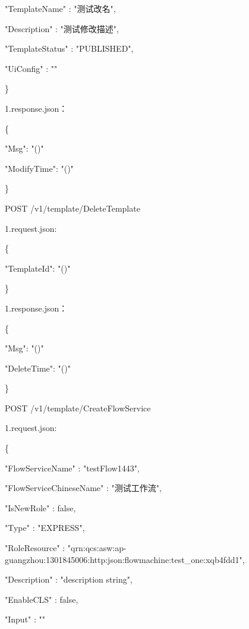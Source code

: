 "TemplateName"        : "测试改名",

"Description"         : "测试修改描述",


"TemplateStatus"      : "PUBLISHED",

"UiConfig"            : ""

\}

1.response.json：

\{

    "Msg": "\@exists()"

    "ModifyTime": "\@exists()"

\}

POST /v1/template/DeleteTemplate

1.request.json:

\{

    "TemplateId": "\@exists()"

\}

1.response.json：

\{

    "Msg": "\@exists()"

    "DeleteTime": "\@exists()"

\}


POST /v1/template/CreateFlowService

1.request.json:

\{

"FlowServiceName"        : "testFlow1443",

"FlowServiceChineseName" : "测试工作流",


"IsNewRole"              : false,

"Type"                   : "EXPRESS",

"RoleResource"           : "qrn:qcs:asw:ap-guangzhou:1301845006:http:json:flowmachine:test\_one:xqb4fdd1",

"Description"            : "description string",

"EnableCLS"              : false,

"Input"                  : ""

